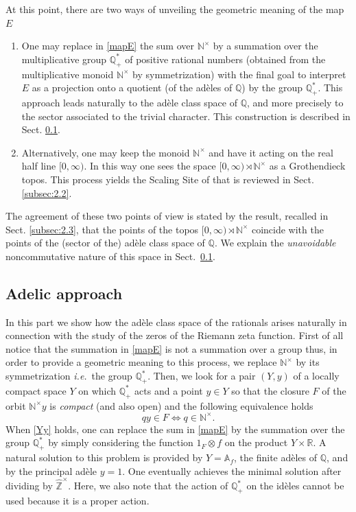 \documentclass[graybox, envcountsect%
]{svmult}
\def\A{{\mathbb A}}
\def\N{{\mathbb N}}
\def\Q{{\mathbb Q}}
\def\R{{\mathbb R}}
\def\Z{{\mathbb Z}}
\def\hatz{{\hat\Z^\times}}
\newcommand{\ie}{{\it i.e.\/}\ }
\def\no{\noindent}
\def\nt{\N^{\times}}
\def\rnt{{[0,\infty)\rtimes{\N^{\times}}}}
\begin{document}
\no At this point, there are two ways of unveiling the geometric meaning of the map $E$
\begin{enumerate}
\item One may replace in \eqref{mapE} the sum over $\nt$ by a summation over the multiplicative group $\Q^*_+$ of positive rational numbers (obtained from the multiplicative monoid $\nt$ by symmetrization) with the final goal to interpret $E$ as a projection onto a quotient (of the ad\`eles of $\Q$) by the group $\Q^*_+$. This approach leads naturally to the ad\`ele class space of $\Q$, and more precisely to the sector associated to the trivial character. This construction is described  in Sect. \ref{subsec:2.1}.
\item Alternatively, one may keep the monoid $\nt$  and have it acting  on the real half line $[0,\infty)$. In this way one sees the space $\rnt$ as a Grothendieck topos. This process yields the Scaling Site of \cite{CC4} that is reviewed  in Sect. \ref{subsec:2.2}.
\end{enumerate}

 \no  The agreement of these two points of view is stated by the result, recalled in Sect. \ref{subsec:2.3}, that the points of the topos $\rnt$ coincide with the points of the (sector of the) ad\`ele class space of $\Q$. We explain the \emph{unavoidable} noncommutative nature of this space in Sect.~\ref{subsec:2.1}.


\subsection{Adelic approach}
\label{subsec:2.1}

In this part we show how the ad\`ele class space of the rationals arises naturally in connection with the study of the zeros of the Riemann zeta function. First of all notice that the summation  in \eqref{mapE} is not a summation over a group thus, in order to provide a geometric meaning to this process, we replace $\nt$ by its symmetrization \ie the group $\Q^*_+$. Then, we look for a pair $(Y,y)$ of a locally compact space $Y$ on which $\Q^*_+$ acts and a point $y\in Y$ so that the closure $F$ of the orbit $\nt y$ is {\em compact }(and also open) and  the following equivalence holds
\begin{equation}\label{Yy}
	qy \in F\iff q\in  \nt.
\end{equation}
When \eqref{Yy} holds,  one can replace the sum  in  \eqref{mapE} by the summation over the  group $\Q^*_+$ by simply considering the function $1_F\otimes f$ on the product $Y\times \R$.\newline
 A natural solution to this problem is provided by $Y=\A_f$, the finite ad\`eles of $\Q$, and by the principal ad\`ele $y=1$. One eventually achieves the minimal solution after dividing by $\hatz$. Here, we also note that the action of $\Q^*_+$ on the id\`eles cannot be used because it is a proper action.
\end{document}
